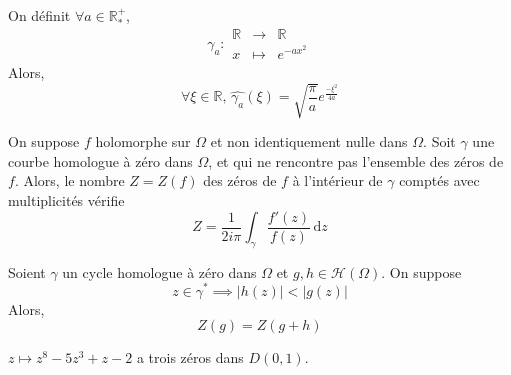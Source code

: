 
  \begin{example}
    On définit $\forall a \in \mathbb{R}^+_*$,
    \[ \gamma_a :
    \begin{array}{ccc}
      \mathbb{R} &\rightarrow& \mathbb{R} \\
      x &\mapsto& e^{-ax^2}
    \end{array}
    \]
    Alors,
    \[ \forall \xi \in \mathbb{R}, \, \widehat{\gamma_a}(\xi) = \sqrt{\frac{\pi}{a}} e^{\frac{- \xi^2}{4a}} \]
  \end{example}


  \begin{application}
    On suppose $f$ holomorphe sur $\Omega$ et non identiquement nulle dans $\Omega$. Soit $\gamma$ une courbe homologue à zéro dans $\Omega$, et qui ne rencontre pas l'ensemble des zéros de $f$. Alors, le nombre $Z = Z(f)$ des zéros de $f$ à l'intérieur de $\gamma$ comptés avec multiplicités vérifie
    \[ Z = \frac{1}{2i\pi} \int_\gamma \frac{f'(z)}{f(z)} \, \mathrm{d}z \]
  \end{application}

  \begin{application}
    Soient $\gamma$ un cycle homologue à zéro dans $\Omega$ et $g, h \in \mathcal{H}(\Omega)$. On suppose
    \[ z \in \gamma^* \implies \vert h(z) \vert < \vert g(z) \vert \]
    Alors,
    \[ Z(g) = Z(g + h) \]
  \end{application}


  \begin{example}
    $z \mapsto z^8 - 5z^3 + z - 2$ a trois zéros dans $D(0,1)$.
  \end{example}

